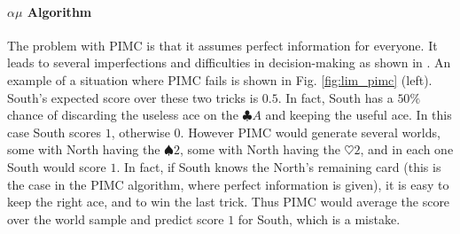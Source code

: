 \documentclass[runningheads]{llncs}
\begin{document}
\begin{algorithm}[t]
\begin{minipage}{5.25cm}
\end{minipage}
\end{algorithm}

\paragraph{$\alpha \mu$ Algorithm}

The problem with PIMC is that it assumes perfect information for everyone. It leads to several imperfections and difficulties in 
decision-making as shown in \cite{frank1998search}. 
An example of a situation where PIMC fails is shown in Fig. \ref{fig:lim_pimc}
(left).
%
South's expected score 
over these two tricks is $0.5$. In fact, South has a $50\%$ chance of discarding the useless ace on the $\clubsuit A$ and keeping the useful ace. In this case South scores $1$, otherwise $0$. However PIMC would generate several worlds, some with North having the $\spadesuit 2$, some with North having the $\heartsuit 2$, and in each one South would score $1$. In fact, if South knows the North's remaining card (this is the case in the PIMC algorithm, where perfect information is given), it is easy to keep the right ace, and to win the last trick. Thus PIMC would average the score over the world sample and predict score $1$ for South, which is a mistake. 
\end{document}
